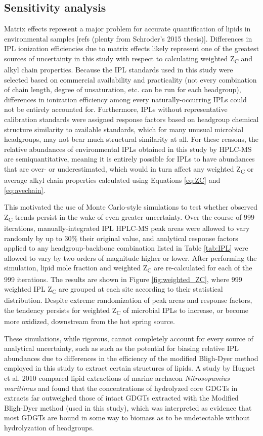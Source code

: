 \subsection{Sensitivity analysis} Matrix effects represent a major problem for accurate quantification of lipids in environmental samples [refs (plenty from Schroder’s 2015 thesis)]. Differences in IPL ionization efficiencies due to matrix effects likely represent one of the greatest sources of uncertainty in this study with respect to calculating weighted Z\textsubscript{C} and alkyl chain properties. Because the IPL standards used in this study were selected based on commercial availability and practicality (not every combination of chain length, degree of unsaturation, etc. can be run for each headgroup), differences in ionization efficiency among every naturally-occurring IPLs could not be entirely accounted for. Furthermore, IPLs without representative calibration standards were assigned response factors based on headgroup chemical structure similarity to available standards, which for many unusual microbial headgroups, may not bear much structural similarity at all. For these reasons, the relative abundances of environmental IPLs obtained in this study by HPLC-MS are semiquantitative, meaning it is entirely possible for IPLs to have abundances that are over- or underestimated, which would in turn affect any weighted Z\textsubscript{C} or average alkyl chain properties calculated using Equations \ref{eq:ZC} and \ref{eq:avechain}.

This motivated the use of Monte Carlo-style simulations to test whether observed Z\textsubscript{C} trends persist in the wake of even greater uncertainty. Over the course of 999 iterations, manually-integrated IPL HPLC-MS peak areas were allowed to vary randomly by up to 30\% their original value, and analytical response factors applied to any headgroup-backbone combination listed in Table \ref{tab:IPL} were allowed to vary by two orders of magnitude higher or lower. After performing the simulation, lipid mole fraction and weighted Z\textsubscript{C} are re-calculated for each of the 999 iterations. The results are shown in Figure \ref{fig:weighted_ZC}, where 999 weighted IPL Z\textsubscript{C} are grouped at each site according to their statistical distribution. Despite extreme randomization of peak areas and response factors, the tendency persists for weighted Z\textsubscript{C} of microbial IPLs to increase, or become more oxidized, downstream from the hot spring source.

These simulations, while rigorous, cannot completely account for every source of analytical uncertainty, such as such as the potential for biasing relative IPL abundances due to differences in the efficiency of the modified Bligh-Dyer method employed in this study to extract certain structures of lipids. A study by Huguet et al. 2010 compared lipid extractions of marine archaeon \textit{Nitrosopumius maritimus} and found that the concentrations of hydrolyzed core GDGTs in extracts far outweighed those of intact GDGTs extracted with the Modified Bligh-Dyer method (used in this study), which was interpreted as evidence that most GDGTs are bound in some way to biomass as to be undetectable without hydrolyzation of headgroups.

